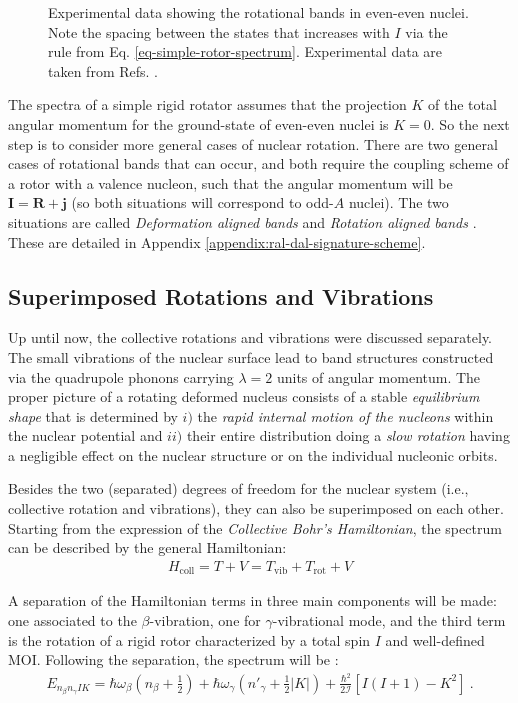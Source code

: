 \begin{figure}
    \caption{Experimental data showing the rotational bands in even-even nuclei. Note the spacing between the states that increases with $I$ via the rule from Eq. \eqref{eq-simple-rotor-spectrum}. Experimental data are taken from Refs. \cite{nica2017nuclear,mccutchan2015nuclear}.}
    \label{rotational-bands-even-even}
\end{figure}

The spectra of a simple rigid rotator assumes that the projection $K$ of the total angular momentum for the ground-state of even-even nuclei is $K=0$. So the next step is to consider more general cases of nuclear rotation. There are two general cases of rotational bands that can occur, and both require the coupling scheme of a rotor with a valence nucleon, such that the angular momentum will be $\mathbf{I}=\mathbf{R}+\mathbf{j}$ (so both situations will correspond to odd-$A$ nuclei). The two situations are called \emph{Deformation aligned bands} and \emph{Rotation aligned bands} \cite{uwitonze2015assignment}. These are detailed in Appendix \ref{appendix:ral-dal-signature-scheme}.

\subsection{Superimposed Rotations and Vibrations}

Up until now, the collective rotations and vibrations were discussed separately. The small vibrations of the nuclear surface lead to band structures constructed via the quadrupole phonons carrying $\lambda=2$ units of angular momentum. The proper picture of a rotating deformed nucleus consists of a stable \emph{equilibrium shape} that is determined by $i)$ the \emph{rapid internal motion of the nucleons} within the nuclear potential and $ii)$ their entire distribution doing a \emph{slow rotation} having a negligible effect on the nuclear structure or on the individual nucleonic orbits.

Besides the two (separated) degrees of freedom for the nuclear system (i.e., collective rotation and vibrations), they can also be superimposed on each other. Starting from the expression of the \emph{Collective Bohr's Hamiltonian}, the spectrum can be described by the general Hamiltonian:
\begin{align}
    H_\text{coll}=T+V=T_\text{vib}+T_\text{rot}+V
\end{align}

A separation of the Hamiltonian terms in three main components will be made: one associated to the $\beta$-vibration, one for $\gamma$-vibrational mode, and the third term is the rotation of a rigid rotor characterized by a total spin $I$ and well-defined MOI. Following the separation, the spectrum will be \cite{ring2004nuclear,li2022model}:
\begin{align}
    E_{n_\beta n_\gamma IK}=\hbar\omega_\beta\left(n_\beta+\frac{1}{2}\right)+\hbar\omega_\gamma\left(n'_\gamma+\frac{1}{2}|K|\right)+\frac{\hbar^2}{2\mathcal{I}}\left[I(I+1)-K^2\right]\ .
    \label{collective-rotation-vibration-energy-spectrum}
\end{align}

